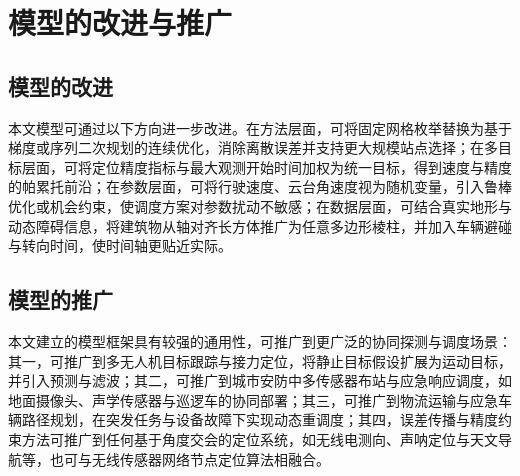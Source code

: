
\section{模型的改进与推广}

\subsection{模型的改进}

本文模型可通过以下方向进一步改进。在方法层面，可将固定网格枚举替换为基于梯度或序列二次规划的连续优化，消除离散误差并支持更大规模站点选择；在多目标层面，可将定位精度指标与最大观测开始时间加权为统一目标，得到速度与精度的帕累托前沿；在参数层面，可将行驶速度、云台角速度视为随机变量，引入鲁棒优化或机会约束，使调度方案对参数扰动不敏感；在数据层面，可结合真实地形与动态障碍信息，将建筑物从轴对齐长方体推广为任意多边形棱柱，并加入车辆避碰与转向时间，使时间轴更贴近实际。

\subsection{模型的推广}

本文建立的模型框架具有较强的通用性，可推广到更广泛的协同探测与调度场景：其一，可推广到多无人机目标跟踪与接力定位，将静止目标假设扩展为运动目标，并引入预测与滤波；其二，可推广到城市安防中多传感器布站与应急响应调度，如地面摄像头、声学传感器与巡逻车的协同部署；其三，可推广到物流运输与应急车辆路径规划，在突发任务与设备故障下实现动态重调度；其四，误差传播与精度约束方法可推广到任何基于角度交会的定位系统，如无线电测向、声呐定位与天文导航等，也可与无线传感器网络节点定位算法相融合\cite{yang2009dingwei}。
